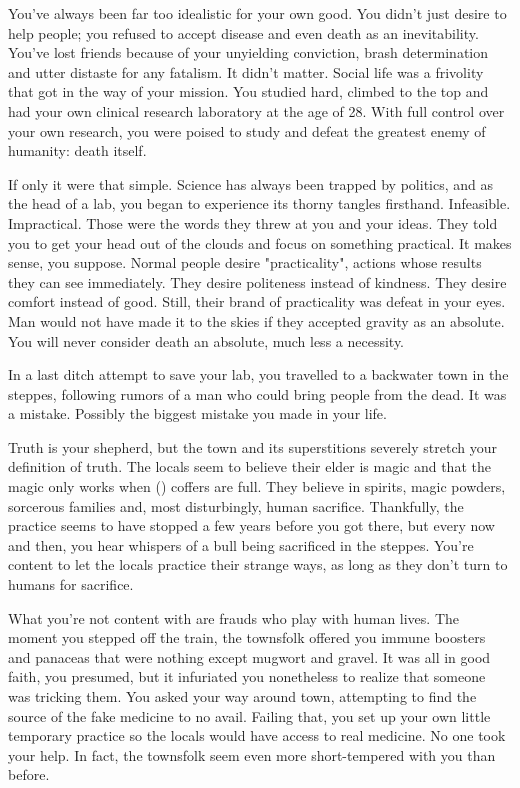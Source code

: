 \documentclass[char]{Pestilence}
\begin{document}
\name{\cOutsider{}}

You've always been far too idealistic for your own good. You didn't just desire to help people; you refused to accept disease and even death as an inevitability. You've lost friends because of your unyielding conviction, brash determination and utter distaste for any fatalism. It didn't matter. Social life was a frivolity that got in the way of your mission. You studied hard, climbed to the top and had your own clinical research laboratory at the age of 28. With full control over your own research, you were poised to study and defeat the greatest enemy of humanity: death itself.

If only it were that simple. Science has always been trapped by politics, and as the head of a lab, you began to experience its thorny tangles firsthand. Infeasible. Impractical. Those were the words they threw at you and your ideas. They told you to get your head out of the clouds and focus on something practical. It makes sense, you suppose. Normal people desire "practicality", actions whose results they can see immediately. They desire politeness instead of kindness. They desire comfort instead of good. Still, their brand of practicality was defeat in your eyes. Man would not have made it to the skies if they accepted gravity as an absolute. You will never consider death an absolute, much less a necessity.

In a last ditch attempt to save your lab, you travelled to a backwater town in the steppes, following rumors of a man who could bring people from the dead. It was a mistake. Possibly the biggest mistake you made in your life.

Truth is your shepherd, but the town and its superstitions severely stretch your definition of truth. The locals seem to believe their elder is magic and that the magic only works when \cElder(\their) coffers are full. They believe in spirits, magic powders, sorcerous families and, most disturbingly, human sacrifice. Thankfully, the practice seems to have stopped a few years before you got there, but every now and then, you hear whispers of a bull being sacrificed in the steppes. You're content to let the locals practice their strange ways, as long as they don't turn to humans for sacrifice.

What you're not content with are frauds who play with human lives. The moment you stepped off the train, the townsfolk offered you immune boosters and panaceas that were nothing except mugwort and gravel. It was all in good faith, you presumed, but it infuriated you nonetheless to realize that someone was tricking them. You asked your way around town, attempting to find the source of the fake medicine to no avail. Failing that, you set up your own little temporary practice so the locals would have access to real medicine. No one took your help. In fact, the townsfolk seem even more short-tempered with you than before.
\end{document}
